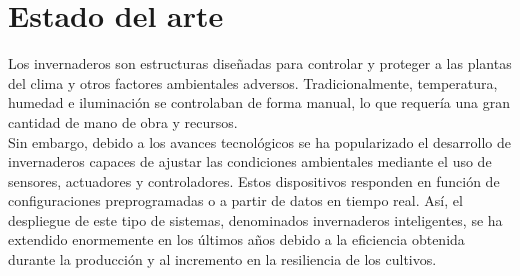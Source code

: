 



\section{Estado del arte}
\label{sec:Estado del arte}

Los invernaderos son estructuras diseñadas para controlar y proteger a las plantas del clima y otros factores ambientales adversos. Tradicionalmente, temperatura, humedad e iluminación se controlaban de forma manual, lo que requería una gran cantidad de mano de obra y recursos. \\
Sin embargo, debido a los avances tecnológicos se ha popularizado el desarrollo de invernaderos capaces de ajustar las condiciones ambientales mediante el uso de sensores, actuadores y controladores. Estos dispositivos responden en función de configuraciones preprogramadas o a partir de datos en tiempo real.  
Así, el despliegue de este tipo de sistemas, denominados invernaderos inteligentes, se ha extendido enormemente en los últimos años debido a la eficiencia obtenida durante la producción y al incremento en la resiliencia de los cultivos\citep{agrofacto}.



